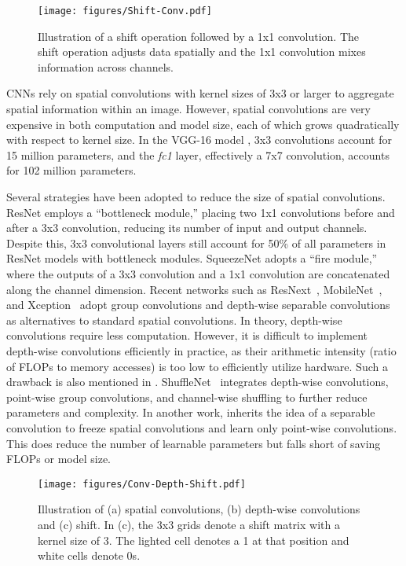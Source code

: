 \documentclass[10pt,twocolumn,letterpaper]{article}
\begin{document}
\begin{figure}[ht]
\centering
\texttt{[image: figures/Shift-Conv.pdf]}
   \caption{Illustration of a shift operation followed by a 1x1 convolution. The shift operation adjusts data spatially and the 1x1 convolution mixes information across channels.}
\label{fig:shift-conv}
\end{figure}

CNNs rely on spatial convolutions with kernel sizes of 3x3 or larger to aggregate spatial information within an image. However, spatial convolutions are very expensive in both computation and model size, each of which grows quadratically with respect to kernel size. In the VGG-16 model \cite{VGG}, 3x3 convolutions account for 15 million parameters, and the \textit{fc1} layer, effectively a 7x7 convolution, accounts for 102 million parameters.

Several strategies have been adopted to reduce the size of spatial convolutions. ResNet\cite{ResNet} employs a ``bottleneck module,'' placing two 1x1 convolutions before and after a 3x3 convolution, reducing its number of input and output channels. Despite this, 3x3 convolutional layers still account for  50\% of all parameters in ResNet models with bottleneck modules. SqueezeNet \cite{SqueezeNet} adopts a ``fire module,'' where the outputs of a 3x3 convolution and a 1x1 convolution are concatenated along the channel dimension. 
Recent networks such as ResNext~\cite{RexNext}, MobileNet~\cite{MobileNet}, and Xception~\cite{Xception} adopt group convolutions and depth-wise separable convolutions as alternatives to standard spatial convolutions. In theory, depth-wise convolutions require less computation. However, it is difficult to implement depth-wise convolutions efficiently in practice, as their arithmetic intensity (ratio of FLOPs to memory accesses) is too low to efficiently utilize hardware.
Such a drawback is also mentioned in \cite{ShuffleNet, Xception}. ShuffleNet~\cite{ShuffleNet} integrates depth-wise convolutions, point-wise group convolutions, and channel-wise shuffling to further reduce parameters and complexity. In another work, \cite{LocalBinaryCNN} inherits the idea of a separable convolution to freeze spatial convolutions and learn only point-wise convolutions. This does reduce the number of learnable parameters but falls short of saving FLOPs or model size. 

\begin{figure*}[ht!]
\centering
\texttt{[image: figures/Conv-Depth-Shift.pdf]}
   \caption{Illustration of (a) spatial convolutions, (b) depth-wise convolutions and (c) shift. In (c), the 3x3 grids denote a shift matrix with a kernel size of 3. The lighted cell denotes a 1 at that position and white cells denote 0s.}
\label{fig:conv-depth-shift}
\vspace{-0.2in}
\end{figure*}
\end{document}
